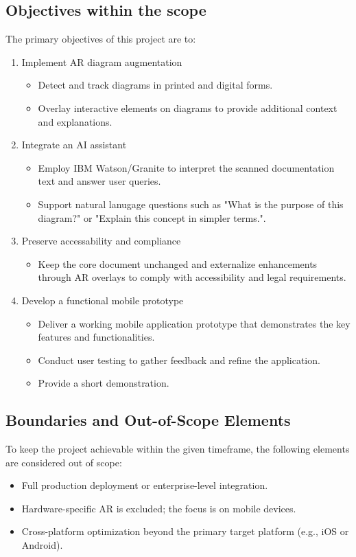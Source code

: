 \documentclass[12pt]{article}
\begin{document}
    \subsection{Objectives within the scope}
    The primary objectives of this project are to:
    \begin{enumerate}
        \item Implement AR diagram augmentation
        \begin{itemize}
            \item Detect and track diagrams in printed and digital forms.
            \item Overlay interactive elements on diagrams to provide additional context and explanations.
        \end{itemize}
        \item Integrate an AI assistant
        \begin{itemize}
            \item Employ IBM Watson/Granite to interpret the scanned documentation text and answer user queries.
            \item Support natural lanugage questions such as "What is the purpose of this diagram?" or "Explain this concept in simpler terms.".
        \end{itemize}
        \item Preserve accessability and compliance
        \begin{itemize}
            \item Keep the core document unchanged and externalize enhancements through AR overlays to comply with accessibility and legal requirements.
        \end{itemize}
        \item Develop a functional mobile prototype
        \begin{itemize}
            \item Deliver a working mobile application prototype that demonstrates the key features and functionalities.
            \item Conduct user testing to gather feedback and refine the application.
            \item Provide a short demonstration.
        \end{itemize}
        \end{enumerate}

    \subsection{Boundaries and Out-of-Scope Elements}
    To keep the project achievable within the given timeframe, the following elements are considered out of scope:
    \begin{itemize}
        \item Full production deployment or enterprise-level integration.
        \item Hardware-specific AR is excluded; the focus is on mobile devices.
        \item Cross-platform optimization beyond the primary target platform (e.g., iOS or Android).
    \end{itemize}
\end{document}

